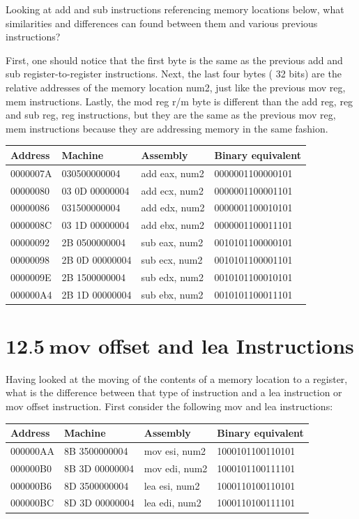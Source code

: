 \documentclass[10pt]{article}
\begin{document}
Looking at add and sub instructions referencing memory locations below, what similarities and differences can found between them and various previous instructions?

First, one should notice that the first byte is the same as the previous add and sub register-to-register instructions. Next, the last four bytes ( 32 bits) are the relative addresses of the memory location num2, just like the previous mov reg, mem instructions. Lastly, the mod reg r/m byte is different than the add reg, reg and sub reg, reg instructions, but they are the same as the previous mov reg, mem instructions because they are addressing memory in the same fashion.

\begin{center}
\begin{tabular}{|l|l|l|l|}
\hline
Address & Machine & Assembly & Binary equivalent \\
\hline
0000007A & 030500000004 & add eax, num2 & 0000001100000101 \\
\hline
00000080 & 03 0D 00000004 & add ecx, num2 & 0000001100001101 \\
\hline
00000086 & 031500000004 & add edx, num2 & 0000001100010101 \\
\hline
0000008C & 03 1D 00000004 & add ebx, num2 & 0000001100011101 \\
\hline
00000092 & 2B 0500000004 & sub eax, num2 & 0010101100000101 \\
\hline
00000098 & 2B 0D 00000004 & sub ecx, num2 & 0010101100001101 \\
\hline
0000009E & 2B 1500000004 & sub edx, num2 & 0010101100010101 \\
\hline
000000A4 & 2B 1D 00000004 & sub ebx, num2 & 0010101100011101 \\
\hline
\end{tabular}
\end{center}

\section*{$\mathbf{1 2 . 5 ~ m o v}$ offset and lea Instructions}
Having looked at the moving of the contents of a memory location to a register, what is the difference between that type of instruction and a lea instruction or mov offset instruction. First consider the following mov and lea instructions:

\begin{center}
\begin{tabular}{|l|l|l|l|}
\hline
Address & Machine & Assembly & Binary equivalent \\
\hline
000000AA & 8B 3500000004 & mov esi, num2 & 1000101100110101 \\
\hline
000000B0 & 8B 3D 00000004 & mov edi, num2 & 1000101100111101 \\
\hline
000000B6 & 8D 3500000004 & lea esi, num2 & 1000110100110101 \\
\hline
000000BC & 8D 3D 00000004 & lea edi, num2 & 1000110100111101 \\
\hline
\end{tabular}
\end{center}
\end{document}
